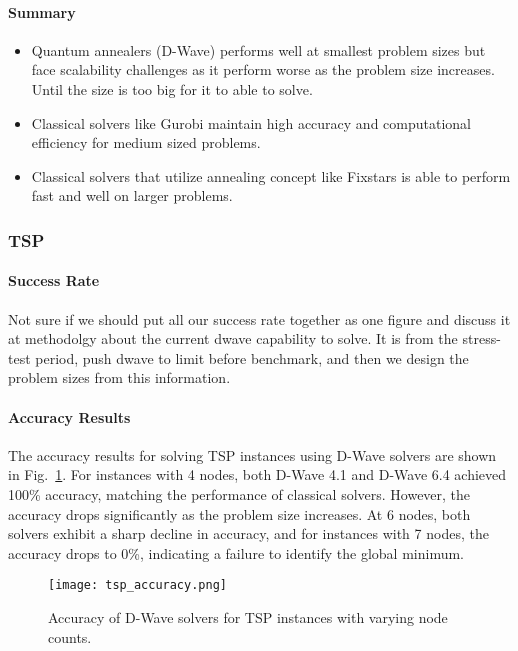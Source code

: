 \documentclass[conference]{IEEEtran}
\begin{document}
\paragraph{Summary}

\begin{itemize}
\item Quantum annealers (D-Wave) performs well at smallest problem sizes but face scalability challenges as it perform worse as the problem size increases. Until the size is too big for it to able to solve.
\item Classical solvers like Gurobi maintain high accuracy and computational efficiency for medium sized problems.
\item Classical solvers that utilize annealing concept like Fixstars is able to perform fast and well on larger problems.
\end{itemize}


\subsubsection{TSP}

\paragraph{Success Rate}
Not sure if we should put all our success rate together as one figure and discuss it at methodolgy about the current dwave capability to solve.
It is from the stress-test period, push dwave to limit before benchmark, and then we design the problem sizes from this information.

\paragraph{Accuracy Results} 
The accuracy results for solving TSP instances using D-Wave solvers are shown in Fig.~\ref{fig_tsp_accuracy}. 
For instances with 4 nodes, both D-Wave 4.1 and D-Wave 6.4 achieved 100\% accuracy, matching the performance of classical solvers. 
However, the accuracy drops significantly as the problem size increases. At 6 nodes, both solvers exhibit a sharp decline in accuracy, and for instances with 7 nodes, the accuracy drops to 0\%, indicating a failure to identify the global minimum.

\begin{figure}[htbp]
\centerline{\texttt{[image: tsp\_accuracy.png]}}
\caption{Accuracy of D-Wave solvers for TSP instances with varying node counts.}
\label{fig_tsp_accuracy}
\end{figure}
\end{document}
